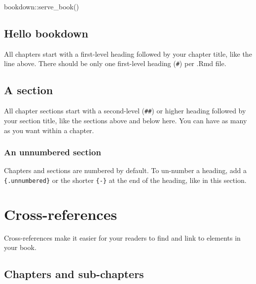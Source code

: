 \documentclass[
  11pt,
  a4paper,
  twoside]{scrbook}
\newenvironment{Shaded}{\begin{snugshade}}{\end{snugshade}}
\newcommand{\FunctionTok}[1]{\textcolor[rgb]{0.00,0.00,0.00}{#1}}
\newcommand{\NormalTok}[1]{#1}
\newcommand{\SpecialCharTok}[1]{\textcolor[rgb]{0.00,0.00,0.00}{#1}}
\begin{document}
\linespread{1}

\begin{Shaded}
\begin{Highlighting}[]
\NormalTok{bookdown}\SpecialCharTok{::}\FunctionTok{serve\_book}\NormalTok{()}
\end{Highlighting}
\end{Shaded}

\linespread{1}

\hypertarget{hello-bookdown}{%
\subsection{Hello bookdown}\label{hello-bookdown}}

All chapters start with a first-level heading followed by your chapter title, like the line above. There should be only one first-level heading (\texttt{\#}) per .Rmd file.

\hypertarget{a-section}{%
\subsection{A section}\label{a-section}}

All chapter sections start with a second-level (\texttt{\#\#}) or higher heading followed by your section title, like the sections above and below here. You can have as many as you want within a chapter.

\hypertarget{an-unnumbered-section}{%
\subsubsection*{An unnumbered section}\label{an-unnumbered-section}}

Chapters and sections are numbered by default. To un-number a heading, add a \texttt{\{.unnumbered\}} or the shorter \texttt{\{-\}} at the end of the heading, like in this section.

\hypertarget{cross}{%
\section{Cross-references}\label{cross}}

Cross-references make it easier for your readers to find and link to elements in your book.

\hypertarget{chapters-and-sub-chapters}{%
\subsection{Chapters and sub-chapters}\label{chapters-and-sub-chapters}}
\end{document}
